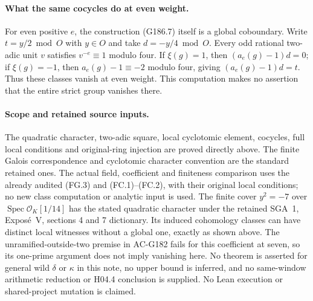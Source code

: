\paragraph{What the same cocycles do at even weight.}
For even positive $e$, the construction (G186.7) itself is a
global coboundary.  Write $t=y/2\bmod O$ with $y\in O$ and
take $d=-y/4\bmod O$.
Every odd rational two-adic unit $v$ satisfies $v^{-e}\equiv1$
modulo four.  If $\xi(g)=1$, then $(a_e(g)-1)d=0$; if
$\xi(g)=-1$, then $a_e(g)-1\equiv-2$ modulo four, giving
$(a_e(g)-1)d=t$.
Thus these classes vanish at even weight.
This computation makes no assertion that the entire strict
group vanishes there.

\paragraph{Scope and retained source inputs.}
The quadratic character, two-adic square, local cyclotomic element,
cocycles, full local conditions and original-ring injection are
proved directly above.  The finite Galois correspondence and
cyclotomic character convention are the standard retained ones.
The actual field, coefficient and finiteness comparison uses the
already audited (FG.3) and (FC.1)--(FC.2), with their original
local conditions; no new class computation or analytic input is used.
The finite cover $y^2=-7$ over
$\operatorname{Spec}\mathcal O_K[1/14]$ has the stated quadratic
character under the retained SGA~1, Expos\'e~V, sections 4 and 7
dictionary.  Its induced cohomology classes can have distinct
local witnesses without a global one, exactly as shown above.
The unramified-outside-two premise in AC-G182 fails for this
coefficient at seven, so its one-prime argument does not imply
vanishing here.  No theorem is asserted for general wild
$\delta$ or $\kappa$ in this note, no upper bound is inferred,
and no same-window arithmetic reduction or H04.4 conclusion
is supplied.  No Lean execution or shared-project mutation is claimed.
